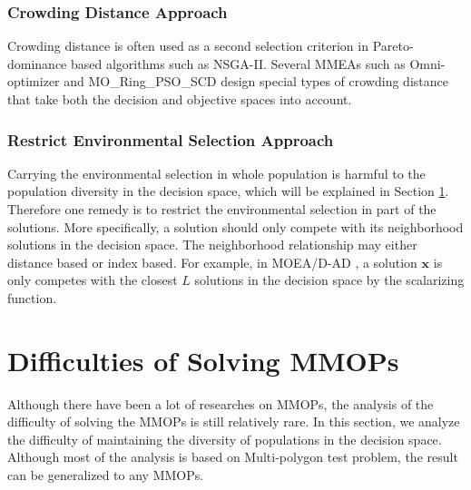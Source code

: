 \documentclass[conference]{IEEEtran}
\begin{document}
\subsubsection{Crowding Distance Approach}
Crowding distance is often used as a second selection criterion in Pareto-dominance based algorithms such as NSGA-II\cite{NSGA-II}. Several MMEAs such as Omni-optimizer\cite{Omni-Optimizer} and MO\_Ring\_PSO\_SCD\cite{MO-Ring-PSO-SCD} design special types of crowding distance that take both the decision and objective spaces into account.
\subsubsection{Restrict Environmental Selection Approach}
Carrying the environmental selection in whole population is harmful to the population diversity in the decision space, which will be explained in Section \ref{Difficulties Analysis}. Therefore one remedy is to restrict the environmental selection in part of the solutions. More specifically, a solution should only compete with its neighborhood solutions in the decision space. The neighborhood relationship may either distance based or index based. For example, in MOEA/D-AD \cite{MOEA/D-AD}, a solution $\boldsymbol{x}$ is only competes with the closest $L$ solutions in the decision space by the scalarizing function.

\section{Difficulties of Solving MMOPs}
\label{Difficulties Analysis}
Although there have been a lot of researches on MMOPs, the analysis of the difficulty of solving the MMOPs is still relatively rare. In this section, we analyze the difficulty of maintaining the diversity of populations in the decision space. Although most of the analysis is based on Multi-polygon test problem, the result can be generalized to any MMOPs. 
\end{document}
